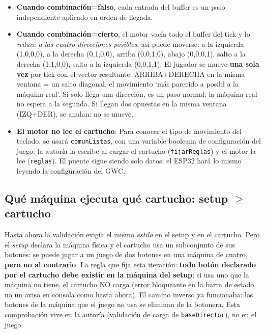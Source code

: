 \begin{itemize}
	\item \textbf{Cuando combinación=falso}, cada entrada del buffer es un paso independiente
	aplicado en orden de llegada.
	
	\item \textbf{Cuando combinación=cierto}, el motor vacía todo el buffer del tick y lo
	\emph{reduce a las cuatro direcciones posibles}, así puede moverse: a la izquierda (1,0,0,0), a la derecha (0,1,0,0), arriba (0,0,1,0), abajo (0,0,0,1), salto a la derecha (1,1,0,0), salto a la izquierda (0,0,1,1). El jugador se mueve \textbf{una sola vez} por tick con el vector
	resultante: ARRIBA+DERECHA en la misma ventana = un salto diagonal, el movimiento
	`más parecido a posibl a la máquina real'. Si solo llega una dirección, es
	un paso normal: la máquina real no espera a la segunda. Si llegan dos opuestas en la
	misma ventana (IZQ+DER), se anulan: no se mueve.
	
	\item \textbf{El motor no lee el cartucho}: Para conocer el tipo de movimiento del teclado, se usará \texttt{comunListas}, con una variable booleana de
	configuración del juego: la autoría la escribe al cargar el cartucho
	(\texttt{fijarReglas}) y el motor la lee (\texttt{reglas}). El puente sigue siendo
	solo datos; el ESP32 hará lo mismo leyendo la configuración del GWC.
\end{itemize}

\subsection{Qué máquina ejecuta qué cartucho: setup \texorpdfstring{$\geq$}{>=} cartucho}
\label{subsec:SetupSuperiorCartucho}

Hasta ahora la validación exigía el mismo \emph{estilo} en el setup y en el cartucho. Pero el \textit{setup}
declara la máquina física y el cartucho usa un subconjunto de sus botones: se puede jugar
a un juego de dos botones en una máquina de cuatro, \textbf{pero no al contrario}. La
regla que fija esta iteración: \textbf{todo botón declarado por el cartucho debe existir
	en la máquina del setup}; si usa uno que la máquina no tiene, el cartucho NO carga
(error bloqueante en la barra de estado, no un aviso en consola como hasta ahora). El
camino inverso ya funcionaba: los botones de la máquina que el juego no usa se eliminan de
la botonera. Esta comprobación vive en la autoría (validación de carga de
\texttt{baseDirector}), no en el juego.

